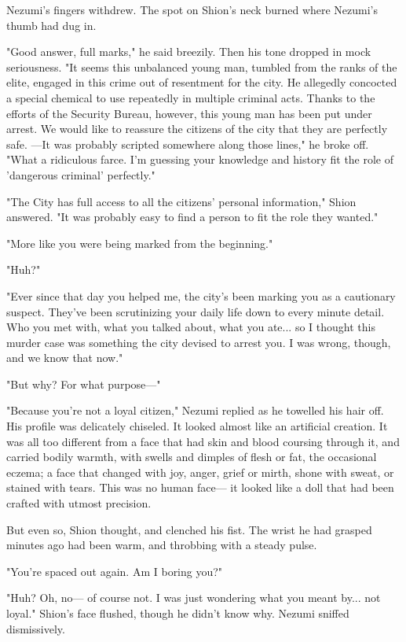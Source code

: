 Nezumi's fingers withdrew. The spot on Shion's neck burned where
Nezumi's thumb had dug in.

"Good answer, full marks," he said breezily. Then his tone dropped in
mock seriousness. "It seems this unbalanced young man, tumbled from the
ranks of the elite, engaged in this crime out of resentment for the
city. He allegedly concocted a special chemical to use repeatedly in
multiple criminal acts. Thanks to the efforts of the Security Bureau,
however, this young man has been put under arrest. We would like to
reassure the citizens of the city that they are perfectly safe. ---It was
probably scripted somewhere along those lines," he broke off. "What a
ridiculous farce. I'm guessing your knowledge and history fit the role
of 'dangerous criminal' perfectly."

"The City has full access to all the citizens' personal information,"
Shion answered. "It was probably easy to find a person to fit the role
they wanted."

"More like you were being marked from the beginning."

"Huh?"

"Ever since that day you helped me, the city's been marking you as a
cautionary suspect. They've been scrutinizing your daily life down to
every minute detail. Who you met with, what you talked about, what you
ate... so I thought this murder case was something the city devised to
arrest you. I was wrong, though, and we know that now."

"But why? For what purpose---"

"Because you're not a loyal citizen," Nezumi replied as he towelled his
hair off. His profile was delicately chiseled. It looked almost like an
artificial creation. It was all too different from a face that had skin
and blood coursing through it, and carried bodily warmth, with swells
and dimples of flesh or fat, the occasional eczema; a face that changed
with joy, anger, grief or mirth, shone with sweat, or stained with
tears. This was no human face--- it looked like a doll that had been
crafted with utmost precision.

But even so, Shion thought, and clenched his fist. The wrist he had
grasped minutes ago had been warm, and throbbing with a steady pulse.

"You're spaced out again. Am I boring you?"

"Huh? Oh, no--- of course not. I was just wondering what you meant by...
not loyal." Shion's face flushed, though he didn't know why. Nezumi
sniffed dismissively.

